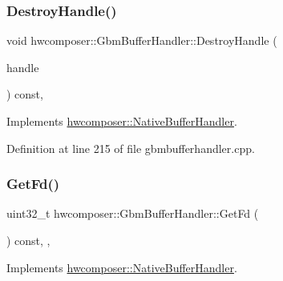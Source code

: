 \subsubsection{\texorpdfstring{Destroy\+Handle()}{DestroyHandle()}}
{\footnotesize\ttfamily void hwcomposer\+::\+Gbm\+Buffer\+Handler\+::\+Destroy\+Handle (\begin{DoxyParamCaption}\item[{\mbox{\hyperlink{alios_2platformdefines_8h_ac0a2eaf260f556d17fe489911f017bdf}{H\+W\+C\+Native\+Handle}}}]{handle }\end{DoxyParamCaption}) const\hspace{0.3cm}{\ttfamily [override]}, {\ttfamily [virtual]}}



Implements \mbox{\hyperlink{classhwcomposer_1_1NativeBufferHandler_ab1e22d9737ca9f6c3e75d1b550e34ce9}{hwcomposer\+::\+Native\+Buffer\+Handler}}.



Definition at line 215 of file gbmbufferhandler.\+cpp.


\begin{DoxyCode}{0}
\end{DoxyCode}
\mbox{\label{classhwcomposer_1_1GbmBufferHandler_ac204254aef6007d09474f8e76f9b6470}} 
\subsubsection{\texorpdfstring{Get\+Fd()}{GetFd()}}
{\footnotesize\ttfamily uint32\+\_\+t hwcomposer\+::\+Gbm\+Buffer\+Handler\+::\+Get\+Fd (\begin{DoxyParamCaption}{ }\end{DoxyParamCaption}) const\hspace{0.3cm}{\ttfamily [inline]}, {\ttfamily [override]}, {\ttfamily [virtual]}}



Implements \mbox{\hyperlink{classhwcomposer_1_1NativeBufferHandler_adb5a4c6d14c012f8a5c71fbb2c984438}{hwcomposer\+::\+Native\+Buffer\+Handler}}.



